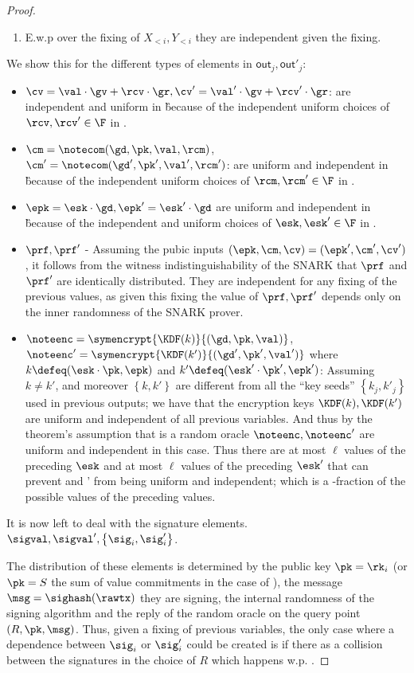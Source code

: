 \documentclass[11pt]{article}
\numberwithin{equation}{section} %
\numberwithin{figure}{section} %
\newcommand{\out}{\ensuremath{\mathsf{out}}\xspace}
\newcommand{\set}[1]{\ensuremath{\left\{#1\right\}}\xspace}
\begin{document}
\begin{proof}
\begin{enumerate}
 \item E.w.p \negl over the fixing of $X_{<i},Y_{<i}$ they are independent given the fixing.
\end{enumerate}
We show this for the different types of elements in $\out_j,\out'_j$:
 \begin{itemize}
  \item $\cv=\val\cdot \gv + \rcv\cdot \gr,\cv'=\val'\cdot \gv + \rcv'\cdot \gr$: are independent and uniform in \G because of the independent uniform choices of $\rcv,\rcv'\in \F$ in \makerandomizedtx.
  \item $\cm = \notecom(\gd,\pk,\val,\rcm)$,$\cm' = \notecom(\gd',\pk',\val',\rcm')$: are uniform and independent in \G because of the independent uniform choices of $\rcm,\rcm'\in \F$ in \makerandomizedoutput.
  \item $\epk=\esk\cdot \gd,\epk'=\esk'\cdot \gd$ are uniform and independent in \G because of the independent and uniform choices of $\esk,\esk'\in \F$ in \makerandomizedoutput.
  \item $\prf,\prf'$ - Assuming the pubic inputs $(\epk,\cm,\cv)=(\epk',\cm',\cv')$, it follows from the witness indistinguishability of the SNARK
  that $\prf$ and $\prf'$ are identically distributed. They are independent for any fixing of the previous values, as given this fixing the value
  of $\prf,\prf'$ depends only on the inner randomness of the SNARK prover.
  \item $\noteenc = \symencrypt{\KDF(k)}{(\gd,\pk,\val)}$,$\noteenc' = \symencrypt{\KDF(k')}{(\gd',\pk',\val')}$
  where $k\defeq (\esk\cdot\pk,\epk)$ and $k'\defeq (\esk'\cdot\pk',\epk')$:
 Assuming $k\neq k'$, and moreover \set{k,k'} are different from all the ``key seeds'' \set{k_j,k'_j} used in previous outputs; we have that the encryption keys $\KDF(k),\KDF(k')$ are uniform and independent of all previous variables.
 And thus by the theorem's assumption that \KDF is a random oracle $\noteenc,\noteenc'$ are uniform and independent in this case.
 Thus there are at most $\ell$ values of the preceding $\esk$ and at most $\ell$ values of the preceding $\esk'$ that 
 can prevent \noteenc and \noteenc' from being uniform and independent;
 which is a \negl-fraction of the possible values of the preceding values.
  \end{itemize}
  
  
  It is now left to deal with the signature elements. $\sigval,\sigval',\set{\sig_i,\sig'_i}$.
  
  The distribution of these elements is determined by the public key $\pk=\rk_i$ (or $\pk =S$ the sum of value commitments in the case of \sigval),
  the message $\msg = \sighash(\rawtx)$ they are signing, the internal randomness of the signing algorithm and the reply of the random oracle 
  \ROsig on the query point $(R,\pk,\msg)$.
  Thus, given a fixing of previous variables, the only case where a dependence between $\sig_i$ or $\sig'_i$ could be created is if there
  as a collision between the signatures in the choice of $R$ which happens w.p. \negl.
\end{proof}
\end{document}
